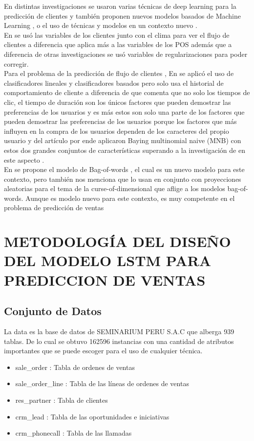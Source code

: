 \documentclass[conference]{IEEEtran}
\begin{document}
En distintas investigaciones se usaron varias técnicas de deep learning para la predicción de clientes \cite{b11} \cite{b12} y también proponen nuevos modelos basados de Machine Learning \cite{b13} \cite{b14}, o el uso de técnicas y modelos en un contexto nuevo \cite{b23}.\\
En \cite{b11} se usó las variables de los clientes junto con el clima para ver el flujo de clientes a diferencia \cite{b12} que aplica más a las variables de los POS además que a diferencia de otras investigaciones se usó variables de regularizaciones para poder corregir.\\
Para el problema de la predicción de flujo de clientes , En \cite{b13} se aplicó el uso de clasificadores lineales y clasificadores basados pero solo usa el historial de comportamiento de cliente a diferencia de  \cite{b14} que comenta que no solo los tiempos de clic, el tiempo de duración son los únicos factores que pueden demostrar las preferencias de los usuarios y es más estos son solo una parte de los factores que pueden demostrar las preferencias de los usuarios porque los factores que más influyen en la compra de los usuarios dependen de los caracteres del propio usuario y del artículo por ende aplicaron Baying multinomial naive (MNB) con estos dos grandes conjuntos de características superando a la investigación de \cite{b13}  en este aspecto .\\
En \cite{b23} se propone el modelo de Bag-of-words , el cual es un nuevo modelo para este contexto, pero también nos menciona que lo usan en conjunto con proyecciones aleatorias para el tema de la curse-of-dimensional que aflige a los modelos bag-of-words. Aunque es modelo nuevo para este contexto, es muy competente en el problema de predicción de ventas

\section{METODOLOGÍA DEL DISEÑO DEL MODELO LSTM PARA PREDICCION DE VENTAS}
\subsection{Conjunto de Datos}
La data es la base de datos de SEMINARIUM PERU S.A.C que alberga 939 tablas. 
De lo cual se obtuvo 162596 instancias con una cantidad de atributos 
importantes que se puede escoger para el uso de cualquier técnica.
\begin{itemize}
    \item sale\_order : Tabla de ordenes de ventas
    \item sale\_order\_line : Tabla de las líneas de ordenes de ventas
    \item res\_partner : Tabla de clientes
    \item crm\_lead : Tabla de las oportunidades e iniciativas
    \item crm\_phonecall : Tabla de las llamadas
\end{itemize}
\end{document}
